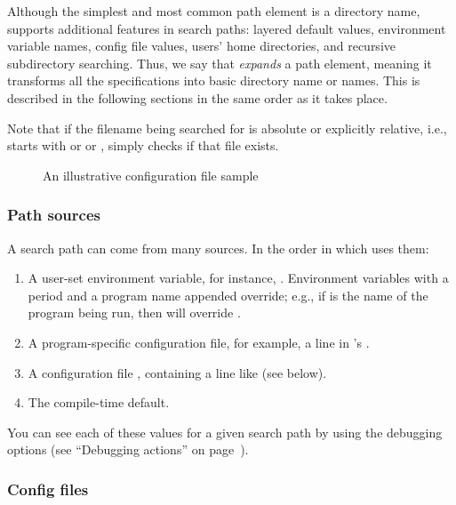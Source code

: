 \documentclass[12pt]{article}
\begin{document}
Although the simplest and most common path element is a directory
name, \KPS{} supports additional features in search paths: layered
default values, environment variable names, config file values, users'
home directories, and recursive subdirectory searching.  Thus, we say
that \KPS{} \emph{expands} a path element, meaning it transforms all
the specifications into basic directory name or names.  This is
described in the following sections in the same order as it takes
place.

Note that if the filename being searched for is absolute or explicitly
relative, i.e., starts with \samp{/} or  or ,
\KPS{} simply checks if that file exists.

\ifSingleColumn
\else
\begin{figure}

\setlength{\abovecaptionskip}{0pt}
  \caption{An illustrative configuration file sample}
  \label{fig:config-sample}
\end{figure}
\fi

\subsubsection{Path sources}
\label{sec:path-sources}

A search path can come from many sources.  In the order in which
\KPS{} uses them:

\begin{enumerate}
\item
  A user-set environment variable, for instance, \@.
  Environment variables with a period and a program name appended
  override; e.g., if  is the name of the program being run,
  then  will override .
\item
  A program-specific configuration file, for exam\-ple, a line
   in 's .
\item   A \KPS{} configuration file , containing a line like
   (see below).
\item The compile-time default.
\end{enumerate}
\noindent You can see each of these values for a given search path by
using the debugging options (see ``Debugging actions'' on
page~\pageref{sec:debugging}).

\subsubsection{Config files}
\label{sec:configfiles}
\end{document}
